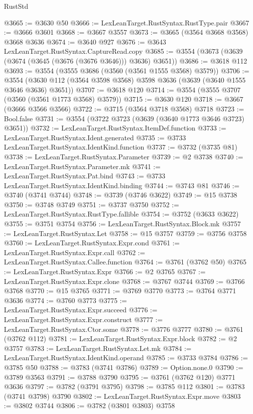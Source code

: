 \begin{lexlean}{RustStd}
\begin{coremodule}
@3665 := @3630 @50
@3666 := LexLeanTarget.RustSyntax.RustType.pair
@3667 := @3666 @3601
@3668 := @3667 @3557
@3673 := @3665 (@3564 @3668 @3568) @3668 @3636
@3674 := @3640 @927
@3676 := @3643 LexLeanTarget.RustSyntax.CaptureRead.copy
@3685 := @3554 (@3673 (@3639 (@3674 (@3645 (@3676 (@3676 @3646))) @3636) @3651))
@3686 := @3618 @112
@3693 := @3554 (@3555 @3686 (@3560 (@3561 @1555 @3568) @3579))
@3706 := @3554 (@3630 @112 (@3564 @3598 @3568) @3598 @3636 (@3639 (@3640 @1555 @3646 @3636) @3651))
@3707 := @3618 @120
@3714 := @3554 (@3555 @3707 (@3560 (@3561 @1773 @3568) @3579))
@3715 := @3630 @120
@3718 := @3667 (@3666 @3566 @3566)
@3722 := @3715 (@3564 @3718 @3568) @3718
@3723 := Bool.false
@3731 := @3554 (@3722 @3723 (@3639 (@3640 @1773 @3646 @3723) @3651))
@3732 := LexLeanTarget.RustSyntax.ItemDef.function
@3733 := LexLeanTarget.RustSyntax.Ident.generated
@3735 := @3733 LexLeanTarget.RustSyntax.IdentKind.function
@3737 := @3732 (@3735 @81)
@3738 := LexLeanTarget.RustSyntax.Parameter
@3739 := @2 @3738
@3740 := LexLeanTarget.RustSyntax.Parameter.mk
@3741 := LexLeanTarget.RustSyntax.Pat.bind
@3743 := @3733 LexLeanTarget.RustSyntax.IdentKind.binding
@3744 := @3743 @81
@3746 := @3740 (@3741 @3744)
@3748 := @3739 (@3746 @3622)
@3749 := @15 @3738
@3750 := @3748 @3749
@3751 := @3737 @3750
@3752 := LexLeanTarget.RustSyntax.RustType.fallible
@3754 := @3752 (@3633 @3622)
@3755 := @3751 @3754
@3756 := LexLeanTarget.RustSyntax.Block.mk
@3757 := LexLeanTarget.RustSyntax.Let
@3758 := @15 @3757
@3759 := @3756 @3758
@3760 := LexLeanTarget.RustSyntax.Expr.cond
@3761 := LexLeanTarget.RustSyntax.Expr.call
@3762 := LexLeanTarget.RustSyntax.Callee.function
@3764 := @3761 (@3762 @50)
@3765 := LexLeanTarget.RustSyntax.Expr
@3766 := @2 @3765
@3767 := LexLeanTarget.RustSyntax.Expr.clone
@3768 := @3767 @3744
@3769 := @3766 @3768
@3770 := @15 @3765
@3771 := @3769 @3770
@3773 := @3764 @3771 @3636
@3774 := @3760 @3773
@3775 := LexLeanTarget.RustSyntax.Expr.succeed
@3776 := LexLeanTarget.RustSyntax.Expr.construct
@3777 := LexLeanTarget.RustSyntax.Ctor.some
@3778 := @3776 @3777
@3780 := @3761 (@3762 @112)
@3781 := LexLeanTarget.RustSyntax.Expr.block
@3782 := @2 @3757
@3783 := LexLeanTarget.RustSyntax.Let.mk
@3784 := LexLeanTarget.RustSyntax.IdentKind.operand
@3785 := @3733 @3784
@3786 := @3785 @50
@3788 := @3783 (@3741 @3786)
@3789 := Option.none.{0}
@3790 := @3789 @3563
@3791 := @3788 @3790
@3795 := @3761 (@3762 @120) @3771 @3636
@3797 := @3782 (@3791 @3795)
@3798 := @3785 @112
@3801 := @3783 (@3741 @3798) @3790
@3802 := LexLeanTarget.RustSyntax.Expr.move
@3803 := @3802 @3744
@3806 := @3782 (@3801 @3803) @3758

\end{coremodule}
\end{lexlean}
